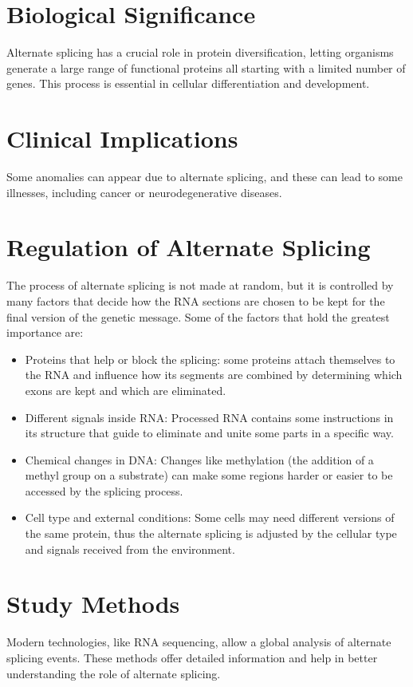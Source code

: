 \documentclass[12pt,a4paper]{article}
\begin{document}
\begin{multicols}{2}
		\section{Biological Significance}
		Alternate splicing has a crucial role in protein diversification, letting organisms generate a large range of functional proteins all starting with a limited number of genes. This process is essential in cellular differentiation and development.
		
		\section{Clinical Implications}
		Some anomalies can appear due to alternate splicing, and these can lead to some illnesses, including cancer or neurodegenerative diseases.
		
		\section{Regulation of Alternate Splicing}
		The process of alternate splicing is not made at random, but it is controlled by many factors that decide how the RNA sections are chosen to be kept for the final version of the genetic message. Some of the factors that hold the greatest importance are:
		\begin{itemize}
			\item Proteins that help or block the splicing: some proteins attach themselves to the RNA and influence how its segments are combined by determining which exons are kept and which are eliminated.
			\item Different signals inside RNA: Processed RNA contains some instructions in its structure that guide to eliminate and unite some parts in a specific way.
			\item Chemical changes in DNA: Changes like methylation (the addition of a methyl group on a substrate) can make some regions harder or easier to be accessed by the splicing process.			
			\item Cell type and external conditions: Some cells may need different versions of the same protein, thus the alternate splicing is adjusted by the cellular type and signals received from the environment. 
		\end{itemize}
		
		\section{Study Methods}
		Modern technologies, like RNA sequencing, allow a global analysis of alternate splicing events. These methods offer detailed information and help in better understanding the role of alternate splicing.
		
	\end{multicols}
	
\end{document}
